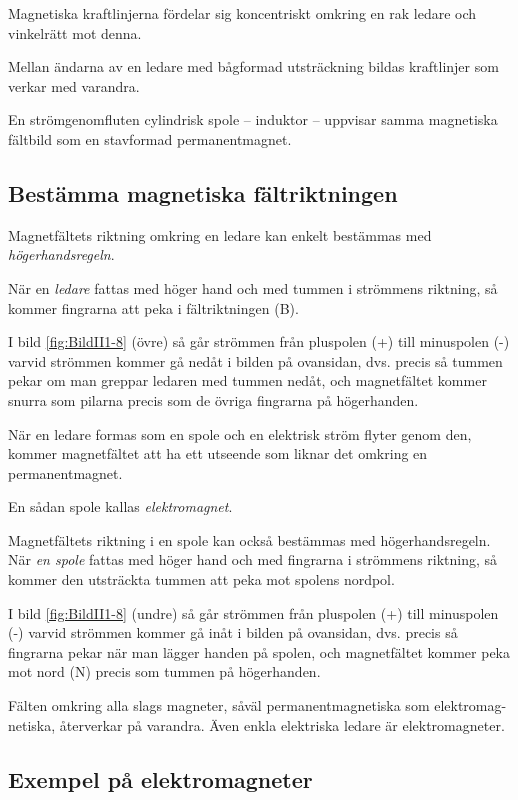 Magnetiska kraftlinjerna fördelar sig koncentriskt omkring en rak ledare och
vinkelrätt mot denna.

Mellan ändarna av en ledare med bågformad utsträckning bildas kraftlinjer som
verkar med varandra.

En strömgenomfluten cylindrisk spole -- induktor -- uppvisar samma magnetiska
fältbild som en stavformad permanentmagnet.

\subsection{Bestämma magnetiska fältriktningen}

Magnetfältets riktning omkring en ledare kan enkelt bestämmas med
\emph{högerhandsregeln}.

När en \emph{ledare} fattas med höger hand och med tummen i strömmens
riktning, så kommer fingrarna att peka i fältriktningen (B).

I bild \ref{fig:BildII1-8} (övre) så går strömmen från pluspolen (+) till
minuspolen (-) varvid strömmen kommer gå nedåt i bilden på ovansidan,
dvs. precis så tummen pekar om man greppar ledaren med tummen nedåt, och
magnetfältet kommer snurra som pilarna precis som de övriga fingrarna på
högerhanden.

När en ledare formas som en spole och en elektrisk ström flyter genom den,
kommer magnetfältet att ha ett utseende som liknar det omkring en
permanentmagnet.

En sådan spole kallas \emph{elektromagnet}.

Magnetfältets riktning i en spole kan också bestämmas med högerhandsregeln.
När \emph{en spole} fattas med höger hand och med fingrarna i strömmens
riktning, så kommer den utsträckta tummen att peka mot spolens nordpol.

I bild \ref{fig:BildII1-8} (undre) så går strömmen från pluspolen (+) till minuspolen
(-) varvid strömmen kommer gå inåt i bilden på ovansidan, dvs. precis så
fingrarna pekar när man lägger handen på spolen, och magnetfältet kommer peka
mot nord (N) precis som tummen på högerhanden.

Fälten omkring alla slags magneter, såväl permanentmagnetiska som elektromag-
netiska, återverkar på varandra. Även enkla
elektriska ledare är elektromagneter.

\clearpage

\subsection{Exempel på elektromagneter}

